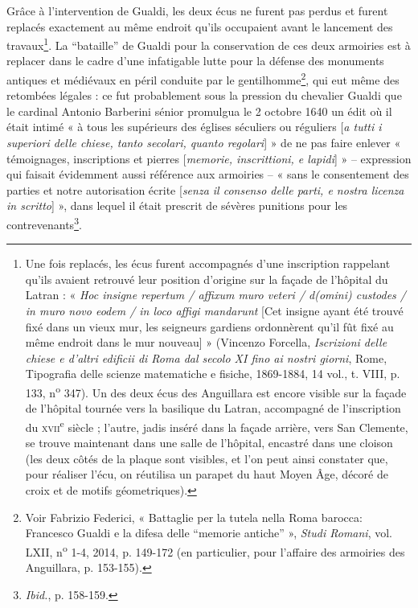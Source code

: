 \documentclass[12pt,twoside,openany]{book}
\begin{document}
Grâce à l’intervention de Gualdi, les deux écus ne furent pas perdus et furent replacés exactement au même endroit qu’ils occupaient avant le lancement des travaux\footnote{Une fois replacés, les écus furent accompagnés d’une inscription rappelant qu’ils avaient retrouvé leur position d’origine sur la façade de l’hôpital du Latran : « \textit{Hoc insigne repertum / affixum muro veteri / d(omini) custodes / in muro novo eodem / in loco affigi mandarunt }[Cet insigne ayant été trouvé fixé dans un vieux mur, les seigneurs gardiens ordonnèrent qu’il fût fixé au même endroit dans le mur nouveau] » (Vincenzo Forcella, \textit{Iscrizioni delle chiese e d’altri edificii di Roma dal secolo XI fino ai nostri giorni}, Rome, Tipografia delle scienze matematiche e fisiche, 1869-1884, 14 vol., t. VIII, p. 133, n\textsuperscript{o} 347). Un des deux écus des Anguillara est encore visible sur la façade de l’hôpital tournée vers la basilique du Latran, accompagné de l’inscription du \textsc{xvii}\textsuperscript{e} siècle ; l’autre, jadis inséré dans la façade arrière, vers San Clemente, se trouve maintenant dans une salle de l’hôpital, encastré dans une cloison (les deux côtés de la plaque sont visibles, et l’on peut ainsi constater que, pour réaliser l’écu, on réutilisa un parapet du haut Moyen Âge, décoré de croix et de motifs géometriques).}. La “bataille” de Gualdi pour la conservation de ces deux armoiries est à replacer dans le cadre d’une infatigable lutte pour la défense des monuments antiques et médiévaux en péril conduite par le gentilhomme\footnote{Voir Fabrizio Federici, « Battaglie per la tutela nella Roma barocca: Francesco Gualdi e la difesa delle “memorie antiche” », \textit{Studi Romani}, vol. LXII, n\textsuperscript{o} 1-4, 2014, p. 149-172 (en particulier, pour l’affaire des armoiries des Anguillara, p. 153-155).}, qui eut même des retombées légales : ce fut probablement sous la pression du chevalier Gualdi que le cardinal Antonio Barberini sénior promulgua le 2 octobre 1640 un édit où il était intimé « à tous les supérieurs des églises séculiers ou réguliers [\textit{a tutti i superiori delle chiese, tanto secolari, quanto regolari}] » de ne pas faire enlever « témoignages, inscriptions et pierres [\textit{memorie, inscrittioni, e lapidi}] » – expression qui faisait évidemment aussi référence aux armoiries – « sans le consentement des parties et notre autorisation écrite [\textit{senza il consenso delle parti, e nostra licenza in scritto}] », dans lequel il était prescrit de sévères punitions pour les contrevenants\footnote{\textit{Ibid.}, p. 158-159.}.
\end{document}
